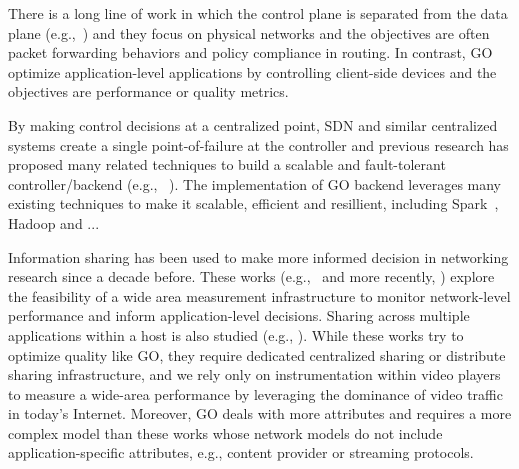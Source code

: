 
 There is a long line of work in which the control plane is separated from the data plane (e.g.,~\cite{rcp,onix,4d,openflow}) and they focus on physical networks and the objectives are often packet forwarding behaviors and policy compliance in routing. In contrast, GO optimize application-level applications by controlling client-side devices and the objectives are performance or quality metrics.  

 By making control decisions at a centralized point, SDN and similar centralized systems create a single point-of-failure at the controller and previous research has proposed many related techniques to build a scalable and fault-tolerant controller/backend (e.g., ~\cite{tootoonchian2012controller,yan2007tesseract}). The implementation of GO backend leverages many existing techniques to make it scalable, efficient and resillient, including Spark~\cite{spark}, Hadoop and ...

 Information sharing has been used to make more informed decision in networking research since a decade before. These works (e.g.,~\cite{stemm2000network} and more recently, \cite{choffnes2010crowdsourcing}) explore the feasibility of a wide area measurement infrastructure to monitor network-level performance and inform application-level decisions. Sharing across multiple applications within a host is also studied (e.g., \cite{balakrishnan1999integrated}). While these works try to optimize quality like GO, they require dedicated centralized sharing or distribute sharing infrastructure, and we rely only on instrumentation within video players to measure a wide-area performance by leveraging the dominance of video traffic in today's Internet. Moreover, GO deals with more attributes and requires a more complex model than these works whose network models do not include application-specific attributes, e.g., content provider or streaming protocols.